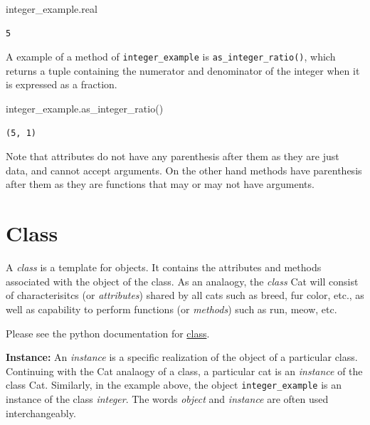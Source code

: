 \documentclass[
  letterpaper,
  DIV=11,
  numbers=noendperiod]{scrreprt}
\newenvironment{Shaded}{\begin{snugshade}}{\end{snugshade}}
\newcommand{\NormalTok}[1]{\textcolor[rgb]{0.00,0.23,0.31}{#1}}
\begin{document}
\begin{Shaded}
\begin{Highlighting}[]
\NormalTok{integer\_example.real}
\end{Highlighting}
\end{Shaded}

\begin{verbatim}
5
\end{verbatim}

A example of a method of \texttt{integer\_example} is
\texttt{as\_integer\_ratio()}, which returns a tuple containing the
numerator and denominator of the integer when it is expressed as a
fraction.

\begin{Shaded}
\begin{Highlighting}[]
\NormalTok{integer\_example.as\_integer\_ratio()}
\end{Highlighting}
\end{Shaded}

\begin{verbatim}
(5, 1)
\end{verbatim}

Note that attributes do not have any parenthesis after them as they are
just data, and cannot accept arguments. On the other hand methods have
parenthesis after them as they are functions that may or may not have
arguments.

\hypertarget{class}{%
\section{Class}\label{class}}

A \emph{class} is a template for objects. It contains the attributes and
methods associated with the object of the class. As an analaogy, the
\emph{class} Cat will consist of characterisitcs (or \emph{attributes})
shared by all cats such as breed, fur color, etc., as well as capability
to perform functions (or \emph{methods}) such as run, meow, etc.

Please see the python documentation for
\href{https://docs.python.org/3/tutorial/classes.html}{class}.

\textbf{Instance:} An \emph{instance} is a specific realization of the
object of a particular class. Continuing with the Cat analaogy of a
class, a particular cat is an \emph{instance} of the class Cat.
Similarly, in the example above, the object \texttt{integer\_example} is
an instance of the class \emph{integer}. The words \emph{object} and
\emph{instance} are often used interchangeably.
\end{document}
